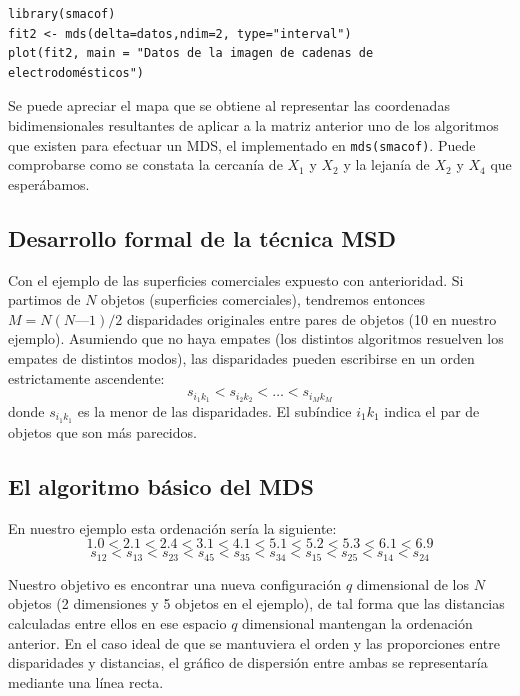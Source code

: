 \documentclass[]{article}
\begin{document}
\hypertarget{right}{}
\begin{verbatim}
library(smacof)
fit2 <- mds(delta=datos,ndim=2, type="interval")
plot(fit2, main = "Datos de la imagen de cadenas de electrodomésticos")
\end{verbatim}

Se puede apreciar el {mapa} que se obtiene al {representar las
coordenadas bidimensionales} resultantes de aplicar a la matriz anterior
uno de los algoritmos que existen para efectuar un MDS, el implementado
en \texttt{mds(smacof)}. Puede comprobarse como se constata la {cercanía
de \(X_1\) y \(X_2\)} y la {lejanía de \(X_2\) y \(X_4\)} que
esperábamos.

\subsection{Desarrollo formal de la técnica
MSD}\label{desarrollo-formal-de-la-tuxe9cnica-msd}

Con el ejemplo de las superficies comerciales expuesto con anterioridad.
Si {partimos de \(N\) objetos (superficies comerciales)}, tendremos
entonces {\(M=N(N—1)/2\) disparidades originales} entre pares de objetos
(10 en nuestro ejemplo). Asumiendo que no haya empates (los distintos
algoritmos resuelven los empates de distintos modos), las {disparidades}
pueden escribirse en un {orden estrictamente ascendente}:
\[s_{i_1k_1}<s_{i_2k_2}<\ldots<s_{i_Mk_M}\] donde {\(s_{i_1k_1}\)} es la
{menor de las disparidades}. El subíndice \(i_1k_1\) indica el {par de
objetos} que son {más parecidos}.

\subsection{El algoritmo básico del
MDS}\label{el-algoritmo-buxe1sico-del-mds}

En nuestro ejemplo esta ordenación sería la siguiente:
\[1.0< 2.1< 2.4< 3.1< 4.1< 5.1< 5.2< 5.3< 6.1< 6.9\]
\[s_{12}<s_{13}<s_{23}<s_{45}<s_{35}<s_{34}<s_{15}<s_{25}<s_{14}<s_{24}\]

Nuestro {objetivo} es encontrar una {nueva configuración \(q\)
dimensional} de los \(N\) objetos (2 dimensiones y 5 objetos en el
ejemplo), de tal forma que las {distancias calculadas entre ellos en ese
espacio \(q\) dimensional mantengan la ordenación anterior}. En el caso
ideal de que se {mantuviera el orden y las proporciones entre
disparidades y distancias}, el {gráfico de dispersión} entre ambas se
representaría mediante una {línea recta}.
\end{document}
